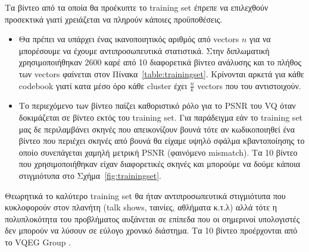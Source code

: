 \indent Τα βίντεο από τα οποία θα προέκυπτε το training set έπρεπε να επιλεχθούν προσεκτικά γιατί χρειάζεται να πληρούν κάποιες προϋποθέσεις.
\begin{itemize}
    \item Θα πρέπει να υπάρχει ένας ικανοποιητικός αριθμός από vectors $n$ για να μπορέσουμε να έχουμε αντιπροσωπευτικά στατιστικά. Στην διπλωματική χρησιμοποιήθηκαν 2600 καρέ από 10 διαφορετικά βίντεο ανάλυσης και το πλήθος των vectors φαίνεται στον Πίνακα~\ref{table:trainingset}. Κρίνονται αρκετά για κάθε codebook γιατί κατα μέσο όρο κάθε cluster έχει $\frac{n}{k}$ vectors που του αντιστοιχούν.
    \item Το περιεχόμενο των βίντεο παίζει καθοριστικό ρόλο για το PSNR του VQ όταν δοκιμάζεται σε βίντεο εκτός του training set. Για παράδειγμα εάν το training set μας δε περιλαμβάνει σκηνές που απεικονίζουν βουνά τότε αν κωδικοποιηθεί ένα βίντεο που περιέχει σκηνές από βουνά θα είχαμε υψηλό σφάλμα κβαντοποίησης το οποίο συνεπάγεται χαμηλή μετρική PSNR (φαινόμενο mismatch). Τα 10 βίντεο που χρησιμοποιήθηκαν είχαν διαφορετικές σκηνές και μπορούμε να δούμε κάποια στιγμιότυπα στο Σχήμα~\ref{fig:trainingset}.
\end{itemize}

\indent Θεωρητικά το καλύτερο training set θα ήταν αντιπροσωπευτικά στιγμιότυπα που κυκλοφορούν στον πλανήτη (talk shows, ταινίες, αθλήματα κ.τ.λ) αλλά τότε η πολυπλοκότητα του προβλήματος αυξάνεται σε επίπεδα που οι σημερινοί υπολογιστές δεν μπορούν να λύσουν σε εύλογο χρονικό διάστημα. Τα 10 βίντεο προέρχονται από το VQEG Group \cite{misc:vqeg}.

